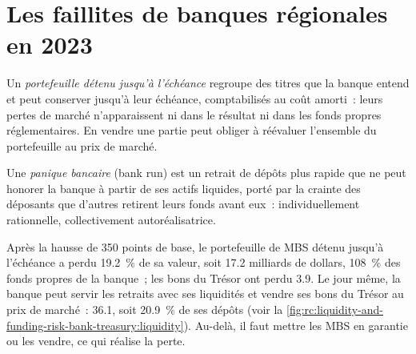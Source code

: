 \section{Les faillites de banques régionales en 2023}

\begin{definition}\label{def:rc:liquidity-and-funding-risk-bank-treasury:htm}
Un \emph{portefeuille détenu jusqu'à l'échéance} regroupe des titres que la banque entend
et peut conserver jusqu'à leur échéance, comptabilisés au coût amorti~: leurs pertes de marché
n'apparaissent ni dans le résultat ni dans les fonds propres réglementaires. En vendre une partie peut obliger
à réévaluer l'ensemble du portefeuille au prix de marché.
\end{definition}

\begin{definition}\label{def:rc:liquidity-and-funding-risk-bank-treasury:run}
Une \emph{panique bancaire} (bank run) est un retrait de dépôts plus rapide que ne peut honorer la banque à partir de ses
actifs liquides, porté par la crainte des déposants que d'autres retirent leurs fonds avant eux~: individuellement
rationnelle, collectivement autoréalisatrice.
\end{definition}

\begin{example}\label{ex:rc:liquidity-and-funding-risk-bank-treasury:run}
Après la hausse de 350 points de base, le portefeuille de MBS détenu jusqu'à l'échéance a perdu 19.2~\% de sa valeur, soit 17.2
milliards de dollars, 108~\% des fonds propres de la banque~; les bons du Trésor ont perdu 3.9. Le jour même, la banque peut servir les retraits avec ses
liquidités et vendre ses bons du Trésor au prix de marché~: 36.1, soit 20.9~\% de ses dépôts
(voir la \cref{fig:rc:liquidity-and-funding-risk-bank-treasury:liquidity}). Au-delà, il faut mettre les MBS en garantie ou
les vendre, ce qui réalise la perte.
\end{example}

